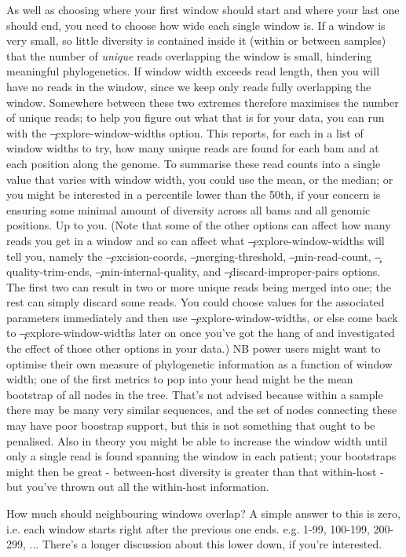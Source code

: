 As well as choosing where your first window should start and where your last one should end, you need to choose how wide each single window is.
If a window is very small, so little diversity is contained inside it (within or between samples) that the number of {\it unique} reads overlapping the window is small, hindering meaningful phylogenetics.
If window width exceeds read length, then you will have no reads in the window, since we keep only reads fully overlapping the window.
Somewhere between these two extremes therefore maximises the number of unique reads; to help you figure out what that is for your data, you can run \p with the \c{--explore-window-widths} option.
This reports, for each in a list of window widths to try, how many unique reads are found for each bam and at each position along the genome.
To summarise these read counts into a single value that varies with window width, you could use the mean, or the median; or you might be interested in a percentile lower than the 50th, if your concern is ensuring some minimal amount of diversity across all bams and all genomic positions.
Up to you.
(Note that some of the other options can affect how many reads you get in a window and so can affect what \c{--explore-window-widths} will tell you, namely the \c{--excision-coords}, \c{--merging-threshold}, \c{--min-read-count}, \c{--quality-trim-ends}, \c{--min-internal-quality}, and \c{--discard-improper-pairs} options.
The first two can result in two or more unique reads being merged into one; the rest can simply discard some reads.
You could choose values for the associated parameters immediately and then use \c{--explore-window-widths}, or else come back to \c{--explore-window-widths} later on once you've got the hang of \p and investigated the effect of those other options in your data.)  
NB power users might want to optimise their own measure of phylogenetic information as a function of window width; one of the first metrics to pop into your head might be the mean bootstrap of all nodes in the tree.
That's not advised because within a sample there may be many very similar sequences, and the set of nodes connecting these may have poor boostrap support, but this is not something that ought to be penalised.
Also in theory you might be able to increase the window width until only a single read is found spanning the window in each patient; your bootstraps might then be great - between-host diversity is greater than that within-host - but you've thrown out all the within-host information.

How much should neighbouring windows overlap?
A simple answer to this is zero, i.e. each window starts right after the previous one ends.
e.g. 1-99, 100-199, 200-299, ...
There's a longer discussion about this lower down, if you're interested.

